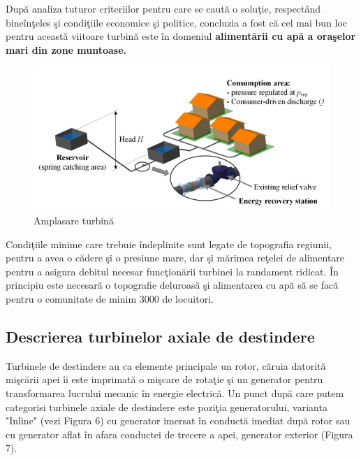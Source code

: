 Dup\u{a} analiza tuturor criteriilor pentru care se caut\u{a} o solu\c{t}ie, respect\^{a}nd bine\^{i}n\c{t}eles \c{s}i condi\c{t}iile economice \c{s}i politice, concluzia a fost c\u{a} cel mai bun loc pentru aceast\u{a} viitoare turbin\u{a} este \^{i}n domeniul \textbf{aliment\u{a}rii cu ap\u{a} a ora\c{s}elor mari din zone muntoase.}

\begin{figure}[h!]
	\centering
	\includegraphics[scale=0.8]{figures/amplasare_turbina.jpg}
	\caption{Amplasare turbin\u{a} \cite{andolfatto2016simulation}}
	\label{Amplasare turbin\u{a}}
\end{figure}

Condi\c{t}iile minime care trebuie \^{i}ndeplinite sunt legate de topografia regiunii, pentru a avea o c\u{a}dere \c{s}i o presiune mare, dar \c{s}i m\u{a}rimea re\c{t}elei de alimentare pentru a asigura debitul necesar func\c{t}ion\u{a}rii turbinei la randament ridicat. \^{I}n principiu este necesar\u{a} o topografie deluroas\u{a} \c{s}i alimentarea cu ap\u{a} s\u{a} se fac\u{a} pentru o comunitate de minim 3000 de locuitori.


\subsection{Descrierea turbinelor axiale de destindere}

Turbinele de destindere au ca elemente principale un rotor, c\u{a}ruia datorit\u{a} mi\c{s}c\u{a}rii apei \^{i}i este imprimat\u{a} o mi\c{s}care de rota\c{t}ie \c{s}i un generator pentru transformarea lucrului mecanic \^{i}n energie electric\u{a}. Un punct dup\u{a} care putem categorisi turbinele axiale de destindere este pozi\c{t}ia generatorului, varianta "Inline" (vezi Figura 6) cu generator imersat \^{i}n conduct\u{a} imediat dup\u{a} rotor sau cu generator aflat \^{i}n afara conductei de trecere a apei, generator exterior (Figura 7).

